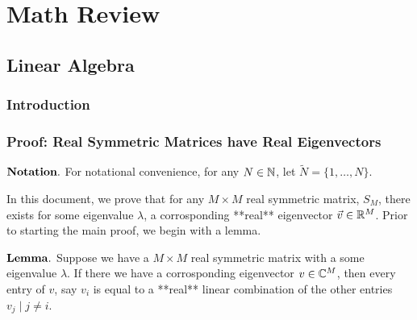 \chapter{Math Review}

\section{Linear Algebra}
\subsection{Introduction}
\begin{definition}[Eigenvalue]
\end{definition}

\begin{definition}[Eigenvector]
\end{definition}

\begin{definition}
\end{definition}

\begin{definition}
\end{definition}

\begin{definition}
\end{definition}


\newpage

\subsection{Proof: Real Symmetric Matrices have Real Eigenvectors}

$\bf Notation.$ For notational convenience, for any $N \in \mathbb{N}$, let $\widetilde{N} = \{1,\dots,N\}$.

In this document, we prove that for any $M \times M$ real symmetric matrix, $S_M$, there exists for some eigenvalue $\lambda$, a corrosponding **real** eigenvector $\vec{v} \in \mathbb{R}^M$. Prior to starting the main proof, we begin with a lemma.

$\bf Lemma.$ Suppose we have a $M \times M$ real symmetric matrix with a some eigenvalue $\lambda$. If there we have a corrosponding eigenvector $v \in \mathbb{C}^M$, then every entry of $v$, say $v_i$ is equal to a **real** linear combination of the other entries $v_j \mid j \neq i$. 


